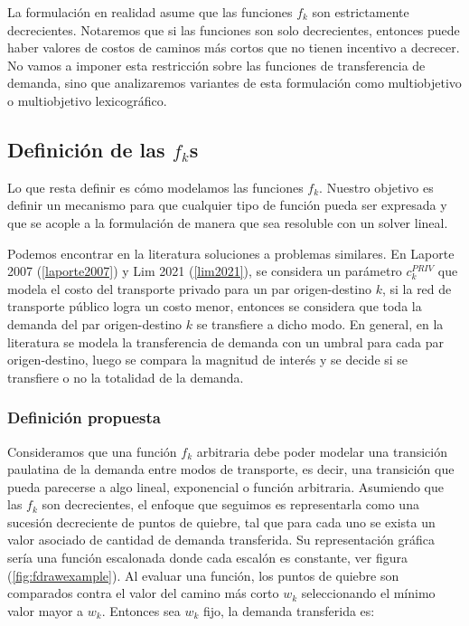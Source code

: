 \documentclass{article}
\begin{document}
  La formulación en realidad asume que las funciones $f_k$ son estrictamente decrecientes. Notaremos que si las funciones son solo decrecientes, entonces puede haber valores de costos de caminos más cortos que no tienen incentivo a decrecer. No vamos a imponer esta restricción sobre las funciones de transferencia de demanda, sino que analizaremos variantes de esta formulación como multiobjetivo o multiobjetivo lexicográfico.

  \subsection{Definición de las $f_k$s}

  Lo que resta definir es cómo modelamos las funciones $f_k$. Nuestro objetivo es definir un mecanismo para que cualquier tipo de función pueda ser expresada y que se acople a la formulación de manera que sea resoluble con un solver lineal.

  Podemos encontrar en la literatura soluciones a problemas similares. En Laporte 2007 (\ref{laporte2007}) y Lim 2021 (\ref{lim2021}), se considera un parámetro $c^{PRIV}_k$ que modela el costo del transporte privado para un par origen-destino $k$, si la red de transporte público logra un costo menor, entonces se considera que toda la demanda del par origen-destino $k$ se transfiere a dicho modo. En general, en la literatura se modela la transferencia de demanda con un umbral para cada par origen-destino, luego se compara la magnitud de interés y se decide si se transfiere o no la totalidad de la demanda.

  \subsubsection{Definición propuesta}

  Consideramos que una función $f_k$ arbitraria debe poder modelar una transición paulatina de la demanda entre modos de transporte, es decir, una transición que pueda parecerse a algo lineal, exponencial o función arbitraria. Asumiendo que las $f_k$ son decrecientes, el enfoque que seguimos es representarla como una sucesión decreciente de puntos de quiebre, tal que para cada uno se exista un valor asociado de cantidad de demanda transferida. Su representación gráfica sería una función escalonada donde cada escalón es constante, ver figura (\ref{fig:fdrawexample}). Al evaluar una función, los puntos de quiebre son comparados contra el valor del camino más corto $w_k$ seleccionando el mínimo valor mayor a $w_k$. Entonces sea $w_k$ fijo, la demanda transferida es:
\end{document}
